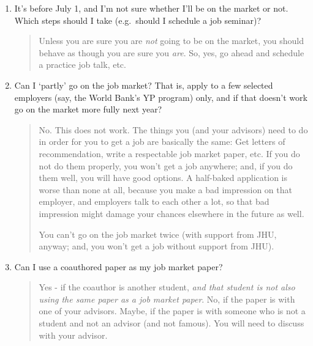 \documentclass{\classes/econtex}
\begin{document}
\begin{enumerate}
\begin{quote}
\begin{comment}
    \end{comment}


  \end{quote}
\item It's before July 1, and I'm not sure whether I'll be on the market or not. Which steps should I take (e.g.\ should I schedule a job seminar)?

  \begin{quote}
    Unless you are sure you are \textit{not} going to be on the market, you should behave as though you are sure you \textit{are}.  So, yes, go ahead and schedule a practice job talk, etc.

  \end{quote}
\item  Can I `partly' go on the job market?  That is, apply to a few
  selected employers (say, the World Bank's YP program) only, and 
  if that doesn't work go on the market more fully next year?

  \begin{quote}
    No.  This does not work.  The things you (and your advisors) need to do in order for you to
    get a job are basically the same: Get letters of recommendation, 
    write a respectable job market paper, etc.  If you do not do them
    properly, you won't get a job anywhere; and, if you do them well,
    you will have good options.  A half-baked application is worse than
    none at all, because you make a bad impression on that employer, and 
    employers talk to each other a lot, so that bad impression might damage
    your chances elsewhere in the future as well.  

    You can't go on the job market twice (with support from JHU, anyway; and, you won't
    get a job without support from JHU).

  \end{quote}
\item  Can I use a coauthored paper as my job market paper?

  \begin{quote}
    Yes - if the coauthor is another student, \textit{and that student is not
    also using the same paper as a job market paper}.  No, if the paper is with one of your
    advisors.  Maybe, if the paper is with someone who is not a student
    and not an advisor (and not famous).  You will need to discuss with your advisor.
    \hypertarget{Where-Should-I-Look-for-Jobs}{}

  \end{quote}


\end{enumerate}
\end{document}
